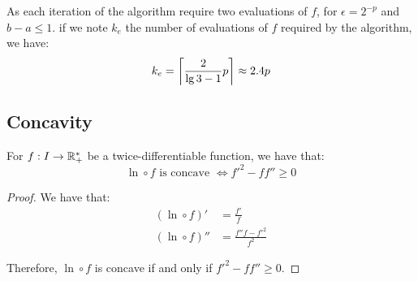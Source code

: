As each iteration of the algorithm require two evaluations of $f$, for $\epsilon = 2^{-p}$ and $b - a \leq 1$. if we note $k_e$ the number of evaluations of $f$ required by the algorithm, we have:
\begin{equation}
    k_e = \left\lceil \frac{2}{\lg 3 - 1} p \right\rceil \approx 2.4 p
\end{equation}



\subsection{Concavity}

\begin{lemma}
    \label{lemma:concavity_log_composed_functions}
    For $f: I \rightarrow \mathbb{R}_+^*$ be a twice-differentiable function, we have that:
    \[ \ln \circ f \text{ is concave } \iff  f'^2 - f f'' \geq 0 \]
\end{lemma}
\begin{proof}
    We have that:
    \begin{align}
        (\ln \circ f)' &= \frac{f'}{f}\\
        (\ln \circ f)'' &= \frac{f''f - f'^2}{f^2}
    \end{align}
    
    Therefore, $\ln \circ f$ is concave if and only if $f'^2 - f f'' \geq 0$.
\end{proof}
